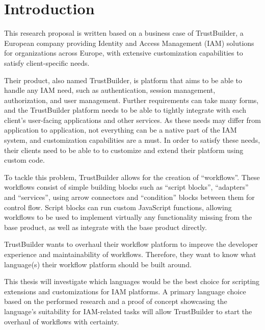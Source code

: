 
\section{Introduction}%
\label{sec:introduction}

This research proposal is written based on a business case of TrustBuilder, a European company providing Identity and Access Management (IAM) solutions for organizations across Europe, with extensive customization capabilities to satisfy client-specific needs.

Their product, also named TrustBuilder, is platform that aims to be able to handle any IAM need, such as authentication, session management, authorization, and user management. Further requirements can take many forms, and the TrustBuilder platform needs to be able to tightly integrate with each client’s user-facing applications and other services. As these needs may differ from application to application, not everything can be a native part of the IAM system, and customization capabilities are a must. In order to satisfy these needs, their clients need to be able to to customize and extend their platform using custom code.

To tackle this problem, TrustBuilder allows for the creation of “workflows”. These workflows consist of simple building blocks such as “script blocks”, “adapters” and “services”, using arrow connectors and “condition” blocks between them for control flow. Script blocks can run custom JavaScript functions, allowing workflows to be used to implement virtually any functionality missing from the base product, as well as integrate with the base product directly.

TrustBuilder wants to overhaul their workflow platform to improve the developer experience and maintainability of workflows. Therefore, they want to know what language(s) their workflow platform should be built around.

This thesis will investigate which languages would be the best choice for scripting extensions and customizations for IAM platforms. A primary language choice based on the performed research and a proof of concept showcasing the language’s suitability for IAM-related tasks will allow TrustBuilder to start the overhaul of workflows with certainty.


